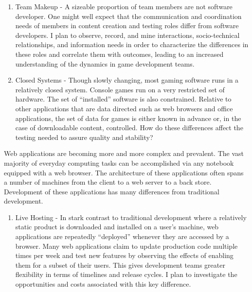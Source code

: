 \documentclass[10pt]{article}
\begin{document}
\begin{small}
\begin{enumerate}
\item Team Makeup - A sizeable proportion of team members
    are not software developer.  One might well expect that the communication and coordination needs of members
    in content creation and testing roles differ from software developers.  I plan to observe, record, and mine
    interactions, socio-technical relationships, and information 
    needs in order to characterize the differences in these roles
    and correlate them with outcomes, leading 
    to an increased understanding of the dynamics in game development teams.

\item Closed Systems - Though slowly changing, most gaming software runs in a relatively closed
    system.  Console games run on a very restricted set of hardware.  The set of ``installed''
    software is also constrained.  Relative to other applications 
    that are data directed such as web browsers and office applications, 
    the set of data for games is either known in advance or,
    in the case of downloadable content, controlled.
    How do these differences affect the testing needed to assure quality and stability?  

\end{enumerate}

Web applications are becoming more and more complex and prevalent.  The vast
majority of everyday computing tasks can be accomplished via any notebook
equipped with a web browser.  The architecture of these applications often spans a number of
machines from the client to a web server to a back store.  Development of these
applications has many differences from traditional development.

\begin{enumerate}

\item Live Hosting - 
    In stark contrast to traditional development where a relatively static
    product is downloaded and installed on a user's machine, web applications are repeatedly ``deployed''
    whenever they are accessed by a browser.  Many web applications 
    claim to update production code multiple times per week and 
    test new features by observing the effects of enabling them for a subset of their users. 
    This gives development teams greater flexibility in terms of timelines and release cycles. 
    I plan to investigate the opportunities and costs associated with this key difference.


\end{enumerate}
\end{small}
\end{document}

